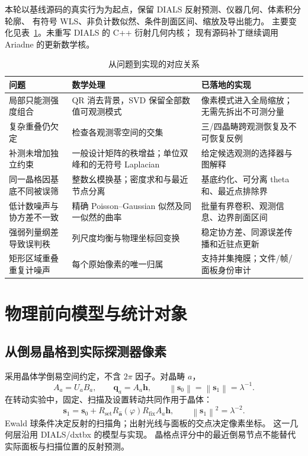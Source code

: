 \documentclass[UTF8,11pt,a4paper,fontset=fandol]{ctexart}
\newcommand{\norm}[1]{\left\lVert#1\right\rVert}
\begin{document}
本轮以基线源码的真实行为为起点，保留 DIALS 反射预测、仪器几何、体素积分轮廓、
有符号 WLS、非负计数似然、条件剖面区间、缩放及导出能力。
主要变化见表~\ref{tab:changes}。未重写 DIALS 的 C++ 衍射几何内核；
现有源码补丁继续调用 Ariadne 的更新数学核。

\begin{table}[htbp]
\centering\small
\caption{从问题到实现的对应关系}\label{tab:changes}
\begin{tabularx}{\textwidth}{@{}p{}XX@{}}
\toprule
问题 & 数学处理 & 已落地的实现\\
\midrule
局部只能测强度组合 & QR 消去背景，SVD 保留全部数值可观测模式 & 像素模式进入全局缩放；无需先拆出不可测分量\\
复杂重叠仍欠定 & 检查各观测零空间的交集 & 三/四晶畴跨观测恢复及不可恢复反例\\
补测未增加独立约束 & 一般设计矩阵的秩增益；单位双峰和的无符号 Laplacian & 给定候选观测的选择器与图解释\\
同一晶格因基底不同被误筛 & 整数幺模换基；密度求和与最近节点分离 & 基底约化、可分离 theta 和、最近点排除界\\
低计数噪声与协方差不一致 & 精确 Poisson--Gaussian 似然及同一似然的曲率 & 批量有界卷积、观测信息、边界剖面区间\\
强弱列量纲差导致误判秩 & 列尺度均衡与物理坐标回变换 & 稳定协方差、同源误差传播和近驻点更新\\
矩形区域重叠重复计噪声 & 每个原始像素的唯一归属 & 支持并集掩膜；文件/帧/面板身份审计\\
\bottomrule
\end{tabularx}
\end{table}

\section{物理前向模型与统计对象}

\subsection{从倒易晶格到实际探测器像素}

采用晶体学倒易空间约定，不含 $2\pi$ 因子。对晶畴 $a$，
\begin{equation}
A_a=U_aB_a,\qquad \bm q_a=A_a\bm h,\qquad
\norm{\bm s_0}=\norm{\bm s_1}=\lambda^{-1}.
\end{equation}
在转动实验中，固定、扫描及设置转动共同作用于晶体：
\begin{equation}
\bm s_1=\bm s_0+
R_{\mathrm{set}}R_{\hat{\bm a}}(\varphi)R_{\mathrm{fix}}A_a\bm h,
\qquad \norm{\bm s_1}^2=\lambda^{-2}.
\end{equation}
Ewald 球条件决定反射的扫描角；出射光线与面板的交点决定像素坐标。
这一几何层沿用 DIALS/dxtbx 的模型与实现\cite{winter2018,waterman2016}。
晶格点评分中的最近倒易节点不能替代实际面板与扫描位置的反射预测。
\end{document}
